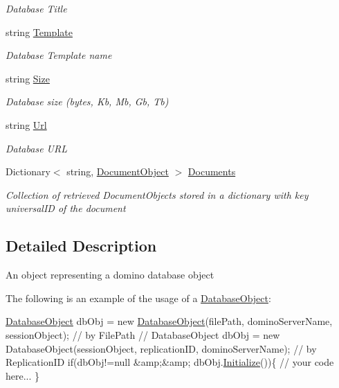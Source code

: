 \begin{DoxyCompactItemize}
\begin{DoxyCompactList}\small\item\em Database Title \end{DoxyCompactList}\item 
string \mbox{\hyperlink{class_database_object_ac8ecdbe9722c00f787a62aef7d3dfa5a}{Template}}
\begin{DoxyCompactList}\small\item\em Database Template name \end{DoxyCompactList}\item 
string \mbox{\hyperlink{class_database_object_ad86f5dd95a9debdef284e21e32936e9e}{Size}}
\begin{DoxyCompactList}\small\item\em Database size (bytes, Kb, Mb, Gb, Tb) \end{DoxyCompactList}\item 
string \mbox{\hyperlink{class_database_object_a12da011e3dc03d3a10ac86df10c84f48}{Url}}
\begin{DoxyCompactList}\small\item\em Database U\+RL \end{DoxyCompactList}\item 
Dictionary$<$ string, \mbox{\hyperlink{class_document_object}{Document\+Object}} $>$ \mbox{\hyperlink{class_database_object_afaf1159aa427c5bcce01c4b8c6f34514}{Documents}}
\begin{DoxyCompactList}\small\item\em Collection of retrieved Document\+Objects stored in a dictionary with key universal\+ID of the document \end{DoxyCompactList}\end{DoxyCompactItemize}


\subsection{Detailed Description}
An object representing a domino database object 

The following is an example of the usage of a {\ttfamily \mbox{\hyperlink{class_database_object}{Database\+Object}}}\+: 
\begin{DoxyCode}
\mbox{\hyperlink{class_database_object}{DatabaseObject}} dbObj = \textcolor{keyword}{new} \mbox{\hyperlink{class_database_object_ab16b4327b02ffedcd1b003cea9d949a1}{DatabaseObject}}(filePath, dominoServerName,  
      sessionObject); \textcolor{comment}{// by FilePath}
\textcolor{comment}{//  DatabaseObject dbObj = new DatabaseObject(sessionObject, replicationID, dominoServerName); // by
       ReplicationID}
\textcolor{keywordflow}{if}(dbObj!=null &amp;&amp; dbObj.\mbox{\hyperlink{class_database_object_a7de43a21bd287deec537cffec343f41d}{Initialize}}())\{
     \textcolor{comment}{// your code here... }
\}
\end{DoxyCode}
 

